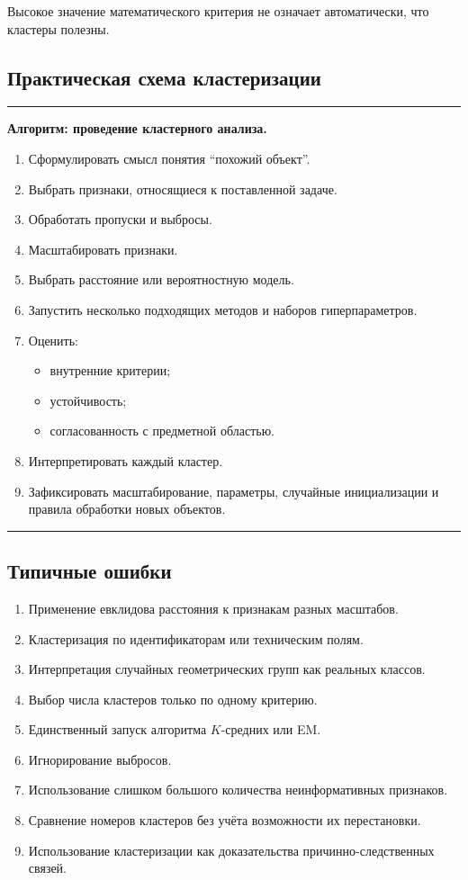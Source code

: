 \documentclass[12pt,a4paper]{article}
\theoremstyle{definition}
\theoremstyle{remark}
\newenvironment{algorithmbox}[1]
{
    \begin{center}
    \begin{minipage}{0.96\textwidth}
    \hrule
    \medskip
    \textbf{Алгоритм: #1.}
    \par\smallskip
}
{
    \medskip
    \hrule
    \end{minipage}
    \end{center}
}
\begin{document}
Высокое значение математического критерия не означает автоматически, что
кластеры полезны.

\subsection{Практическая схема кластеризации}

\begin{algorithmbox}{проведение кластерного анализа}
\begin{enumerate}
    \item Сформулировать смысл понятия ``похожий объект''.
    \item Выбрать признаки, относящиеся к поставленной задаче.
    \item Обработать пропуски и выбросы.
    \item Масштабировать признаки.
    \item Выбрать расстояние или вероятностную модель.
    \item Запустить несколько подходящих методов и наборов гиперпараметров.
    \item Оценить:
    \begin{itemize}
        \item внутренние критерии;
        \item устойчивость;
        \item согласованность с предметной областью.
    \end{itemize}
    \item Интерпретировать каждый кластер.
    \item Зафиксировать масштабирование, параметры, случайные инициализации
          и правила обработки новых объектов.
\end{enumerate}
\end{algorithmbox}

\subsection{Типичные ошибки}

\begin{enumerate}
    \item Применение евклидова расстояния к признакам разных масштабов.
    \item Кластеризация по идентификаторам или техническим полям.
    \item Интерпретация случайных геометрических групп как реальных классов.
    \item Выбор числа кластеров только по одному критерию.
    \item Единственный запуск алгоритма $K$-средних или EM.
    \item Игнорирование выбросов.
    \item Использование слишком большого количества неинформативных
          признаков.
    \item Сравнение номеров кластеров без учёта возможности их перестановки.
    \item Использование кластеризации как доказательства причинно-следственных
          связей.
\end{enumerate}
\end{document}
